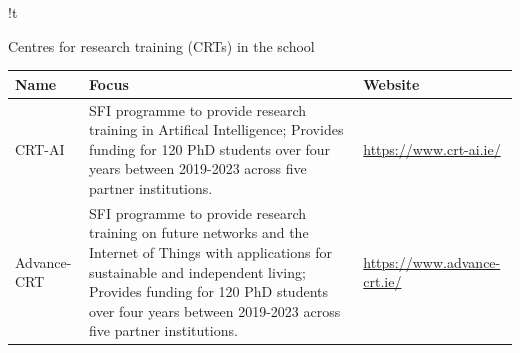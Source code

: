 
\begin{tabbox}{!t}

\caption[Centres for research training in the school]{Centres for research training (CRTs) in the school}
\label{tab:crts}
\footnotesize 

\begin{tabular}{p{2.5cm}
                p{7.5cm}
                !{\qquad}
                p{4cm}
                }
\toprule
Name & Focus & Website\\ 
\midrule 





CRT-AI&
SFI programme to provide research training
in Artifical Intelligence;
Provides funding for 120 PhD students over four
years between 2019-2023 across five partner 
institutions. & \url{https://www.crt-ai.ie/} \\
\hdashline
Advance-CRT&
SFI programme to provide research training
on future networks and the Internet of Things with
applications for sustainable and independent living;
Provides funding for 120 PhD students over four
years between 2019-2023 across five partner 
institutions. & \url{https://www.advance-crt.ie/} \\

\bottomrule 
\end{tabular}


\end{tabbox}


